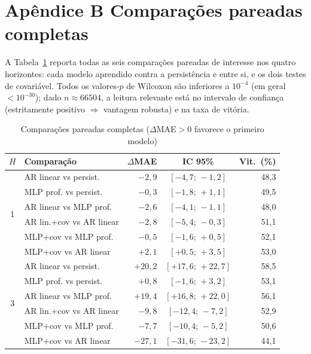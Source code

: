 \documentclass[12pt,a4paper,oneside]{article}
\begin{document}
\newpage
\section*{Apêndice B \textendash{} Comparações pareadas completas}

A Tabela~\ref{tab:apB} reporta todas as seis comparações pareadas de
interesse nos quatro horizontes: cada modelo aprendido contra a
persistência e entre si, e os dois testes de covariável. Todos os
valores-$p$ de Wilcoxon são inferiores a $10^{-4}$ (em geral
$<10^{-30}$); dado $n\approx\num{66504}$, a leitura relevante está no
intervalo de confiança (estritamente positivo $\Rightarrow$ vantagem
robusta) e na taxa de vitória.

\begin{table}[H]
\centering
\caption{Comparações pareadas completas ($\Delta$MAE${}>0$ favorece o primeiro modelo)}
\label{tab:apB}
\small
\begin{tabular}{@{}clrcr@{}}
\toprule
\textbf{$H$} & \textbf{Comparação} & \textbf{$\Delta$MAE} & \textbf{IC 95\%} & \textbf{Vit.\ (\%)} \\
\midrule
\multirow{6}{*}{1}
 & AR linear vs persist. & $-2{,}9$ & $[-4{,}7;\,-1{,}2]$ & 48,3 \\
 & MLP prof. vs persist. & $-0{,}3$ & $[-1{,}8;\,+1{,}1]$ & 49,5 \\
 & AR linear vs MLP prof. & $-2{,}6$ & $[-4{,}1;\,-1{,}1]$ & 48,0 \\
 & AR lin.+cov vs AR linear & $-2{,}8$ & $[-5{,}4;\,-0{,}3]$ & 51,1 \\
 & MLP+cov vs MLP prof. & $-0{,}5$ & $[-1{,}6;\,+0{,}5]$ & 52,1 \\
 & MLP+cov vs AR linear & $+2{,}1$ & $[+0{,}5;\,+3{,}5]$ & 53,0 \\
\midrule
\multirow{6}{*}{3}
 & AR linear vs persist. & $+20{,}2$ & $[+17{,}6;\,+22{,}7]$ & 58,5 \\
 & MLP prof. vs persist. & $+0{,}8$ & $[-1{,}6;\,+3{,}2]$ & 53,1 \\
 & AR linear vs MLP prof. & $+19{,}4$ & $[+16{,}8;\,+22{,}0]$ & 56,1 \\
 & AR lin.+cov vs AR linear & $-9{,}8$ & $[-12{,}4;\,-7{,}2]$ & 52,9 \\
 & MLP+cov vs MLP prof. & $-7{,}7$ & $[-10{,}4;\,-5{,}2]$ & 50,6 \\
 & MLP+cov vs AR linear & $-27{,}1$ & $[-31{,}6;\,-23{,}2]$ & 44,1 \\

\end{tabular}
\end{table}
\end{document}
